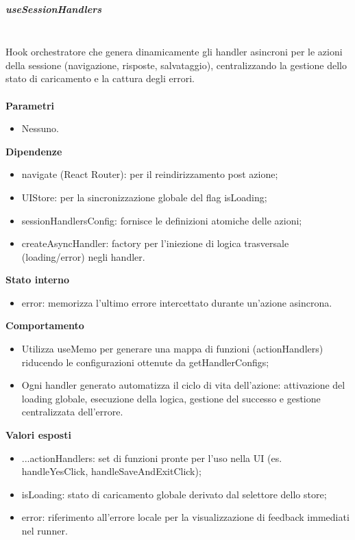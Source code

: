 \documentclass[a4paper,12pt]{article}
\begin{document}
                \subparagraph{useSessionHandlers}\mbox{}\\
                Hook orchestratore che genera dinamicamente gli handler asincroni per le azioni della sessione (navigazione, risposte, salvataggio), centralizzando la gestione dello stato di caricamento e la cattura degli errori.\\\\
                \textbf{Parametri}
                \begin{itemize}
                    \item Nessuno.
                \end{itemize}
                \textbf{Dipendenze}
                \begin{itemize}
                    \item {\ttfamily navigate} (React Router): per il reindirizzamento post azione;
                    \item {\ttfamily UIStore}: per la sincronizzazione globale del flag {\ttfamily isLoading};
                    \item {\ttfamily sessionHandlersConfig}: fornisce le definizioni atomiche delle azioni;
                    \item {\ttfamily createAsyncHandler}: factory per l'iniezione di logica trasversale (loading/error) negli handler.
                \end{itemize}
                \textbf{Stato interno}
                \begin{itemize}
                    \item {\ttfamily error}: memorizza l'ultimo errore intercettato durante un'azione asincrona.
                \end{itemize}
                \textbf{Comportamento}
                \begin{itemize}
                    \item Utilizza {\ttfamily useMemo} per generare una mappa di funzioni ({\ttfamily actionHandlers}) riducendo le configurazioni ottenute da {\ttfamily getHandlerConfigs};
                    \item Ogni handler generato automatizza il ciclo di vita dell'azione: attivazione del loading globale, esecuzione della logica, gestione del successo e gestione centralizzata dell'errore.
                \end{itemize}
                \textbf{Valori esposti}
                \begin{itemize}
                    \item {\ttfamily ...actionHandlers}: set di funzioni pronte per l'uso nella UI (es. {\ttfamily handleYesClick}, {\ttfamily handleSaveAndExitClick});
                    \item {\ttfamily isLoading}: stato di caricamento globale derivato dal selettore dello store;
                    \item {\ttfamily error}: riferimento all'errore locale per la visualizzazione di feedback immediati nel runner.
                \end{itemize}
                
\end{document}
